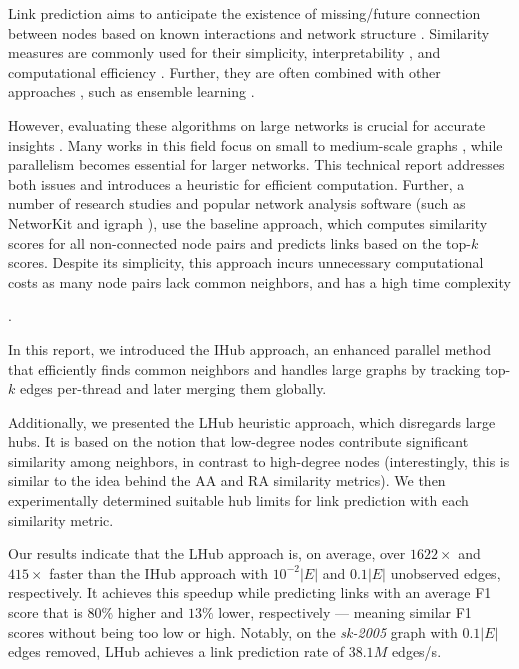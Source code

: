 Link prediction aims to anticipate the existence of missing/future connection between nodes based on known interactions and network structure \cite{arrar2023comprehensive}. Similarity measures are commonly used for their simplicity, interpretability \cite{pai2019netdx, barbieri2014follow}, and computational efficiency \cite{garcia2014link}. Further, they are often combined with other approaches \cite{kumari2022supervised, abuoda2020link, pai2019netdx}, such as ensemble learning \cite{zhou2012ensemble}.

However, evaluating these algorithms on large networks is crucial for accurate insights \cite{zhou2021progresses, zhou2021experimental}. Many works in this field focus on small \cite{guo2019node, rafiee2020cndp, mumin2022efficient, papadimitriou2012fast, vega2021link, saifi2023fast, ferreira2019scalability, benhidour2022approach} to medium-scale graphs \cite{yang2015new, cui2016bounded, kalkanfinding, mohan2017scalable, wang2019link, bastami2019gravitation, shin2012multi, garcia2014link}, while parallelism becomes essential for larger networks. This technical report addresses both issues and introduces a heuristic for efficient computation. Further, a number of research studies \cite{gatadi2023lpcd, saifi2023fast, benhidour2022approach, mumin2022efficient, rafiee2020cndp, guo2019node, yang2015new, papadimitriou2012fast, wang2019link} and popular network analysis software (such as NetworKit \cite{staudt2016networkit} and igraph \cite{csardi2006igraph}), use the baseline approach, which computes similarity scores for all non-connected node pairs and predicts links based on the top-$k$ scores. Despite its simplicity, this approach incurs unnecessary computational costs as many node pairs lack common neighbors, and has a high time complexity.

In this report, we introduced the IHub approach, an enhanced parallel method that efficiently finds common neighbors and handles large graphs by tracking top-$k$ edges per-thread and later merging them globally. Additionally, we presented the LHub heuristic approach, which disregards large hubs. It is based on the notion that low-degree nodes contribute significant similarity among neighbors, in contrast to high-degree nodes (interestingly, this is similar to the idea behind the AA and RA similarity metrics). We then experimentally determined suitable hub limits for link prediction with each similarity metric.

Our results indicate that the LHub approach is, on average, over $1622\times$ and $415\times$ faster than the IHub approach with $10^{-2}|E|$ and $0.1|E|$ unobserved edges, respectively. It achieves this speedup while predicting links with an average F1 score that is $80\%$ higher and $13\%$ lower, respectively --- meaning similar F1 scores without being too low or high. Notably, on the \textit{sk-2005} graph with $0.1|E|$ edges removed, LHub achieves a link prediction rate of $38.1M$ edges/s.

